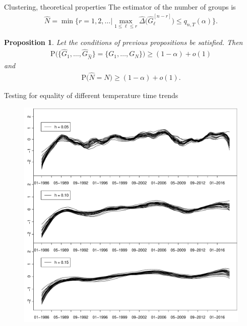 \documentclass[10pt]{beamer}
\newcommand{\Prob}{\mathrm{P}}
\newtheorem{prop}{Proposition}
\begin{document}
\begin{frame}{Clustering, theoretical properties}
The estimator of the number of groups is
\begin{align*}
\widehat{N} = \min \Big\{ r = 1,2,\ldots \Big| \max_{1 \le \ell \le r} \widehat{\Delta} \big( \widehat{G}_\ell^{[n-r]} \big) \le q_{n,T}(\alpha) \Big\}.
\end{align*}\pause
\begin{prop}\label{prop-clustering-1}
Let the conditions of previous propositions be satisfied. Then 
\begin{align*}
\Prob \Big( \big\{ \widehat{G}_1,\ldots,\widehat{G}_{\widehat{N}} \big\} = \{ G_1,\ldots,G_N \} \Big) \ge (1-\alpha) + o(1)
\end{align*}
and 
\begin{align*}
\Prob \big( \widehat{N} = N \big) \ge (1-\alpha) + o(1).
\end{align*}
\end{prop}
\end{frame}
\begin{frame}{Testing for equality of different temperature time trends}
  \begin{figure}
    \centering
    \includegraphics[height=0.85\textheight]{stations_data.pdf}
    \label{figure:station_data}
  \end{figure}
\end{frame}
\end{document}
